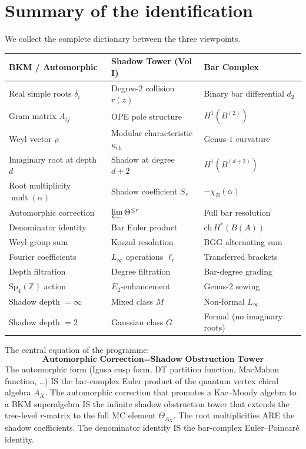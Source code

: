 \documentclass[11pt]{amsart}
\theoremstyle{definition}
\theoremstyle{remark}
\DeclareMathOperator{\mult}{mult}
\begin{document}
\section{Summary of the identification}\label{sec:summary}

We collect the complete dictionary between the three viewpoints.

\medskip
\begin{center}
\renewcommand{\arraystretch}{1.4}
\begin{tabular}{lll}
\hline
\textbf{BKM / Automorphic} & \textbf{Shadow Tower (Vol I)} &
 \textbf{Bar Complex} \\
\hline
Real simple roots $\delta_i$ &
 Degree-$2$ collision $r(z)$ &
 Binary bar differential $d_2$ \\
Gram matrix $A_{ij}$ &
 OPE pole structure &
 $H^1(B^{(2)})$ \\
Weyl vector $\rho$ &
 Modular characteristic $\kappa_{\mathrm{ch}}$ &
 Genus-$1$ curvature \\
Imaginary root at depth $d$ &
 Shadow at degree $d+2$ &
 $H^1(B^{(d+2)})$ \\
Root multiplicity $\mult(\alpha)$ &
 Shadow coefficient $S_r$ &
 $-\chi_B(\alpha)$ \\
Automorphic correction &
 $\varprojlim \Theta^{\leq r}$ &
 Full bar resolution \\
Denominator identity &
 Bar Euler product &
 $\mathrm{ch}\, H^*(B(A))$ \\
Weyl group sum &
 Koszul resolution &
 BGG alternating sum \\
Fourier coefficients &
 $L_\infty$ operations $\ell_r$ &
 Transferred brackets \\
Depth filtration &
 Degree filtration &
 Bar-degree grading \\
$\mathrm{Sp}_4(\mathbb{Z})$ action &
 $E_2$-enhancement &
 Genus-$2$ sewing \\
Shadow depth $= \infty$ &
 Mixed class $M$ &
 Non-formal $L_\infty$ \\
Shadow depth $= 2$ &
 Gaussian class $G$ &
 Formal (no imaginary roots) \\
\hline
\end{tabular}
\end{center}

\bigskip

The central equation of the programme:
\[
 \boxed{
 \textbf{Automorphic Correction} = \textbf{Shadow Obstruction Tower}
 }
\]
The automorphic form (Igusa cusp form, DT partition function,
MacMahon function, \ldots) IS the bar-complex Euler product of
the quantum vertex chiral algebra $A_X$. The automorphic
correction that promotes a Kac--Moody algebra to a BKM
superalgebra IS the infinite shadow obstruction tower that extends the
tree-level $r$-matrix to the full MC element $\Theta_{A_X}$.
The root multiplicities ARE the shadow coefficients. The
denominator identity IS the bar-complex Euler--Poincar\'e
identity.
\end{document}

